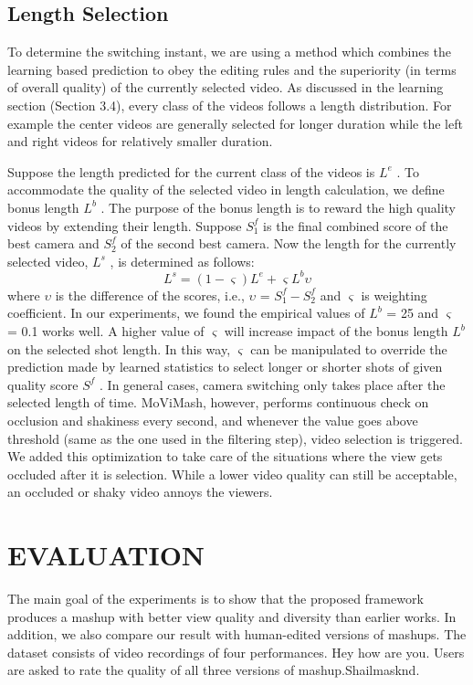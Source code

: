 \documentclass{sig-alternate-05-2015}
\begin{document}
\subsection{Length Selection}
To determine the switching instant, we are using a method which
combines the learning based prediction to obey the editing rules and
the superiority (in terms of overall quality) of the currently selected
video. As discussed in the learning section (Section 3.4), every
class of the videos follows a length distribution. For example the
center videos are generally selected for longer duration while the
left and right videos for relatively smaller duration.\par
Suppose the length predicted for the current class of the videos
is $L^e$ . To accommodate the quality of the selected video in length
calculation, we define bonus length $L^b$ . The purpose of the bonus
length is to reward the high quality videos by extending their length.
Suppose $S_1^f$ is the final combined score of the best camera and $S_2^f$
of the second best camera. Now the length for the currently selected
video, $L^s$ , is determined as follows:
\begin{equation}
    L^s=(1-\varsigma)L^e+\varsigma L^b\upsilon
\end{equation}
where $\upsilon$ is the difference of the scores, i.e., $\upsilon$ = $S^f_1-S^f_2$
and $\varsigma$ is
weighting coefficient. In our experiments, we found the empirical
values of $L^b$ = 25 and $\varsigma$ = 0.1 works well. A higher value of
$\varsigma$ will increase impact of the bonus length $L^b$ on the selected shot
length. In this way, $\varsigma$ can be manipulated to override the prediction
made by learned statistics to select longer or shorter shots of given
quality score $S^f$ .
In general cases, camera switching only takes place after the selected length of time. MoViMash, however, performs continuous
check on occlusion and shakiness every second, and whenever the
value goes above threshold (same as the one used in the filtering
step), video selection is triggered. We added this optimization to
take care of the situations where the view gets occluded after it is
selection. While a lower video quality can still be acceptable, an
occluded or shaky video annoys the viewers.
\section{EVALUATION}
The main goal of the experiments is to show that the proposed
framework produces a mashup with better view quality and diversity than earlier works. In addition, we also compare our result with
human-edited versions of mashups. The dataset consists of video
recordings of four performances. Hey how are you. Users are asked to rate the quality of all three versions of
mashup.Shailmasknd.
\end{document}
